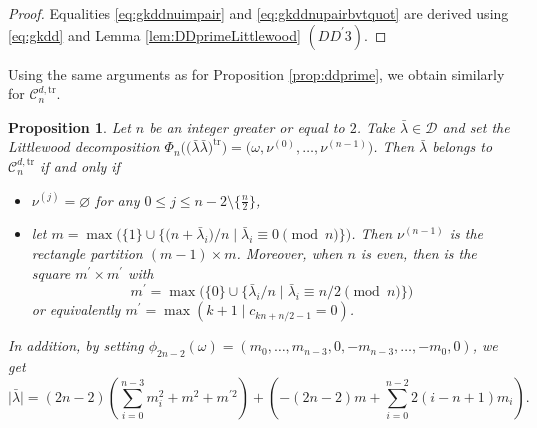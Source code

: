 \documentclass[10pt,a4paper]{amsart}
\newtheorem{Proposition}[Theorem]{Proposition}
 { \theoremstyle{definition}
\newtheorem{Definition}[Theorem]{Definition}
\newtheorem{Note}[Theorem]{Note}
\newtheorem{Example}[Theorem]{Example}
\newtheorem{Remark}[Theorem]{Remark} }
\numberwithin{equation}{section}
\newcommand{\cC}{\mathcal{C}}
\def\ccd{\mathcal {D}}
\newcommand{\N}{\mathbb{N}}
\begin{document}
\begin{proof}
	Equalities \eqref{eq:gkddnuimpair} and \eqref{eq:gkddnupairbvtquot} are
	derived using \eqref{eq:gkdd} and Lemma \ref{lem:DDprimeLittlewood} $%
	(DD^{\prime }3)$.
\end{proof}


Using the same arguments as for Proposition \ref{prop:ddprime}, we obtain
similarly for $\cC_{n}^{d,\mathrm{tr}}$.

\begin{Proposition}
\label{prop:ddprimepair} Let $n$ be an integer greater or equal to $2$. Take
$\bar{\lambda}\in\ccd$ and set the Littlewood decomposition $\Phi_n\bigl(\bigl(\bar{
\lambda}\bar{\lambda}\bigr)^\mathrm{tr}\bigr)=\bigl(\omega,\nu^{(0)},\dots,\nu^{(n-1)}
\bigr)$. Then $\bar{\lambda}$ belongs to $\cC_{n}^{d,\mathrm{tr}} $ if and
only if
\begin{itemize}\itemsep=0pt
\item $\nu^{(j)}=\varnothing$ for any $0\leq j\leq n-2\setminus\bigl\lbrace\frac{n}{
2}\bigr\rbrace$,

\item let $m=\max\bigl(\bigl\lbrace 1\rbrace\cup\lbrace\bigl(n+\bar{\lambda}_i\bigr)/n \mid%
\bar{\lambda}_i\equiv 0\pmod{n}\bigr\rbrace\bigr)$. Then $\nu^{(n-1)}$ is the rectangle partition $(m-1)\times m$. Moreover, when $n$ is even, then  is the square $m^{\prime }\times m^{\prime }$ with
\[
m^{\prime}=\max\bigl(\lbrace 0\rbrace\cup\bigl\lbrace \bar{\lambda}_i/n \mid\bar{\lambda}_i\equiv n/2\pmod{n}\bigr\rbrace\bigr)
\]
or equivalently $m^{\prime
}=\max(k+1\mid c_{kn+n/2-1}= 0)$.
\end{itemize}

In addition, by setting $\phi_{2n-2}(\omega)=(m_0,\dots,m_{n-3},0,-m_{n-3},\dots,-m_0,0)$, we get
\begin{equation*}
\bigl\lvert \bar{\lambda}\bigr\rvert=(2n-2)\left(\sum_{i=0}^{n-3}m_i^2+m^2+m^{\prime
2}\right)+\left(-(2n-2)m+\sum_{i=0}^{n-2}2(i-n+1)m_i\right).
\end{equation*}
\end{Proposition}
\end{document}
